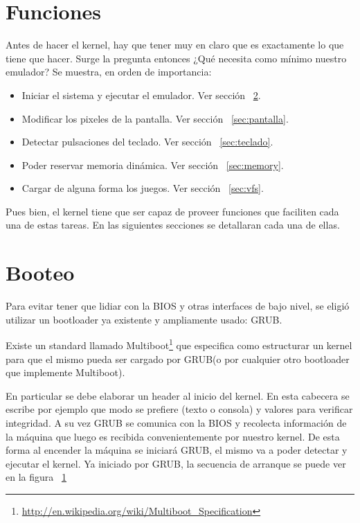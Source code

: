 \section{Funciones}
Antes de hacer el kernel, hay que tener muy en claro que es exactamente lo que tiene que hacer. Surge la pregunta entonces ¿Qué necesita como mínimo nuestro emulador? Se muestra, en orden de importancia:
\begin{itemize}
\item Iniciar el sistema y ejecutar el emulador. Ver sección ~\ref{sec:booteo}.
\item Modificar los pixeles de la pantalla. Ver sección ~\ref{sec:pantalla}.
\item Detectar pulsaciones del teclado. Ver sección ~\ref{sec:teclado}.
\item Poder reservar memoria dinámica. Ver sección ~\ref{sec:memory}.
\item Cargar de alguna forma los juegos. Ver sección ~\ref{sec:vfs}.
\end{itemize}
Pues bien, el kernel tiene que ser capaz de proveer funciones que faciliten cada una de estas tareas. En las siguientes secciones se detallaran cada una de ellas.

\section{Booteo}\label{sec:booteo}
Para evitar tener que lidiar con la BIOS y otras interfaces de bajo nivel, se eligió utilizar un bootloader ya existente y ampliamente usado: GRUB.

Existe un standard llamado Multiboot\footnote{\url{http://en.wikipedia.org/wiki/Multiboot_Specification}} que especifica como estructurar un kernel para que el mismo pueda ser cargado por GRUB(o por cualquier otro bootloader que implemente Multiboot).

\begin{figure}\caption{\label{fig:boot}}
\centering{}

\end{figure}
En particular se debe elaborar un header al inicio del kernel. En esta cabecera se escribe por ejemplo que modo se prefiere (texto o consola) y valores para verificar integridad. A su vez GRUB se comunica con la BIOS y recolecta información de la máquina que luego es recibida convenientemente por nuestro kernel. De esta forma al encender la máquina se iniciará GRUB, el mismo va a poder detectar y ejecutar el kernel. Ya iniciado por GRUB, la secuencia de arranque se puede ver en la figura ~\ref{fig:boot}


